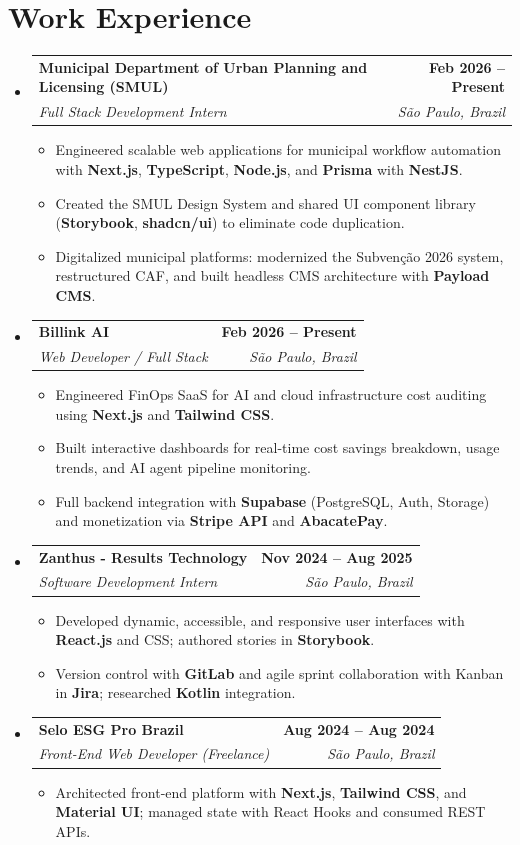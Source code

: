 \documentclass[a4paper,10pt]{article}
\makeatletter
\newcommand{\resumeItem}[1]{
  \item\small{#1}
}
\newcommand{\resumeSubheading}[4]{
  \vspace{1pt}\item[]
    \begin{tabular*}{1.0\textwidth}[t]{l@{\extracolsep{\fill}}r}
      \textbf{#1} & \textbf{\small #2} \\
      \textit{\small#3} & \textit{\small #4} \\
    \end{tabular*}\vspace{-4pt}
}
\makeatother
\begin{document}
\section{Work Experience}
\begin{itemize}[leftmargin=0pt, label={}]

  \resumeSubheading
    {Municipal Department of Urban Planning and Licensing (SMUL)}{Feb 2026 -- Present}
    {Full Stack Development Intern}{São Paulo, Brazil}
    \begin{itemize}[leftmargin=12pt]
      \resumeItem{Engineered scalable web applications for municipal workflow automation with \textbf{Next.js}, \textbf{TypeScript}, \textbf{Node.js}, and \textbf{Prisma} with \textbf{NestJS}.}
      \resumeItem{Created the SMUL Design System and shared UI component library (\textbf{Storybook}, \textbf{shadcn/ui}) to eliminate code duplication.}
      \resumeItem{Digitalized municipal platforms: modernized the Subvenção 2026 system, restructured CAF, and built headless CMS architecture with \textbf{Payload CMS}.}
    \end{itemize}

  \resumeSubheading
    {Billink AI}{Feb 2026 -- Present}
    {Web Developer / Full Stack}{São Paulo, Brazil}
    \begin{itemize}[leftmargin=12pt]
      \resumeItem{Engineered FinOps SaaS for AI and cloud infrastructure cost auditing using \textbf{Next.js} and \textbf{Tailwind CSS}.}
      \resumeItem{Built interactive dashboards for real-time cost savings breakdown, usage trends, and AI agent pipeline monitoring.}
      \resumeItem{Full backend integration with \textbf{Supabase} (PostgreSQL, Auth, Storage) and monetization via \textbf{Stripe API} and \textbf{AbacatePay}.}
    \end{itemize}

  \resumeSubheading
    {Zanthus - Results Technology}{Nov 2024 -- Aug 2025}
    {Software Development Intern}{São Paulo, Brazil}
    \begin{itemize}[leftmargin=12pt]
      \resumeItem{Developed dynamic, accessible, and responsive user interfaces with \textbf{React.js} and CSS; authored stories in \textbf{Storybook}.}
      \resumeItem{Version control with \textbf{GitLab} and agile sprint collaboration with Kanban in \textbf{Jira}; researched \textbf{Kotlin} integration.}
    \end{itemize}

  \resumeSubheading
    {Selo ESG Pro Brazil}{Aug 2024 -- Aug 2024}
    {Front-End Web Developer (Freelance)}{São Paulo, Brazil}
    \begin{itemize}[leftmargin=12pt]
      \resumeItem{Architected front-end platform with \textbf{Next.js}, \textbf{Tailwind CSS}, and \textbf{Material UI}; managed state with React Hooks and consumed REST APIs.}
    \end{itemize}


\end{itemize}
\end{document}
